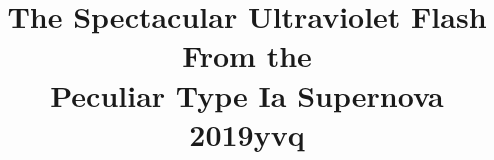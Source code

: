 \documentclass[twocolumn]{aastex63}
\begin{document}
\title{The Spectacular Ultraviolet Flash From the \\ Peculiar Type Ia Supernova 2019yvq}


\end{document}
